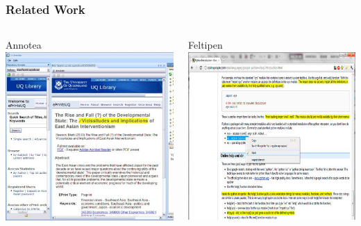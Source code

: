 \begin{frame}
	\frametitle{Related Work}
	\begin{columns}[T]
		\begin{column}{5.5cm}
			\begin{block}{Annotea}
				\includegraphics[width=1\textwidth]{./images/highlight1.jpg}
			\end{block}
		\end{column}
		\begin{column}{5.5cm}
			\begin{block}{Feltipen}
				\includegraphics[width=1\textwidth]{./images/highlight4.jpg}
			\end{block}
		\end{column}
	\end{columns}
\end{frame}
